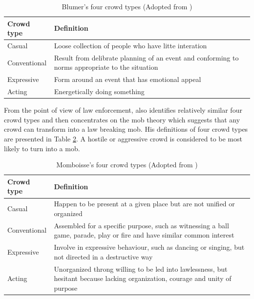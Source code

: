\begin{table}
	\caption{Blumer's four crowd types (Adopted from \citet{Imhonopi2013})}
	\label{table:blumerCrowdType}
	\centering
	\begin{tabular}{|l|p{10cm}|}
		\hline
		\textbf{Crowd type} & \textbf{Definition} \\ \hline \hline
		Casual & Loose collection of people who have litte interation \\ \hline
		Conventional & Result from delibrate planning of an event and conforming to norms appropriate to the situation \\ \hline
		Expressive & Form around an event that has emotional appeal \\ \hline
		Acting & Energetically doing something \\ \hline
	\end{tabular}
\end{table}

From the point of view of law enforcement, \citet{Momboisse1967} also identifies relatively similar four crowd types and then concentrates on the mob theory which suggests that any crowd can transform into a law breaking mob. His definitions of four crowd types are presented in Table \ref{table:momboisseCrowdType}. A hostile or aggressive crowd is considered to be most likely to turn into a mob.

\begin{table}
	\caption{Momboisse's four crowd types (Adopted from \citet{Schweingruber2000})}
	\label{table:momboisseCrowdType}
	\centering
	\begin{tabular}{|l|p{10cm}|}
		\hline
		\textbf{Crowd type} & \textbf{Definition} \\ \hline \hline
		Casual & Happen to be present at a given place but are not unified or organized \\ \hline
		Conventional & Assembled for a specific purpose, such as witnessing a ball game, parade, play or fire 
		and have similar common interest \\ \hline
		Expressive & Involve in expressive behaviour, such as dancing or singing, but not directed in a destructive way \\ \hline
		Acting & Unorganized throng willing to be led into lawlessness, but hesitant because lacking organization, courage and unity of purpose \\ \hline
	\end{tabular}
\end{table}



